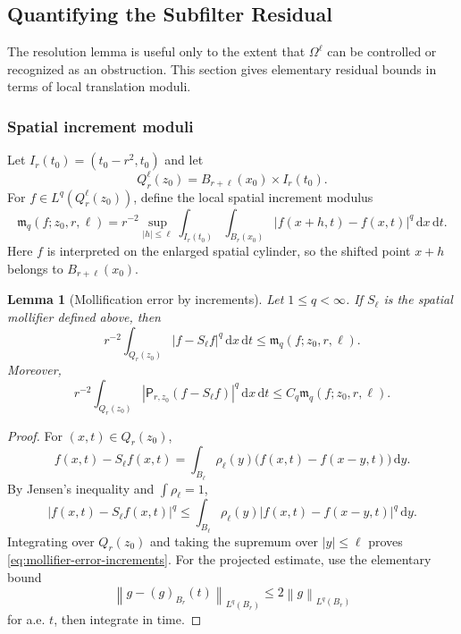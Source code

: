 \documentclass[11pt]{article}
\numberwithin{equation}{section}
\newtheorem{lemma}[theorem]{Lemma}
\newcommand{\dxdt}{\,\mathrm dx\,\mathrm dt}
\newcommand{\dy}{\,\mathrm dy}
\newcommand{\norm}[2]{\left\lVert #1\right\rVert_{#2}}
\newcommand{\Pf}{\mathsf P}
\begin{document}
\subsection{Quantifying the Subfilter Residual}

The resolution lemma is useful only to the extent that $\Omega^\ell$ can be controlled or recognized as an obstruction.  This section gives elementary residual bounds in terms of local translation moduli.

\subsubsection{Spatial increment moduli}

Let $I_r(t_0)=(t_0-r^2,t_0)$ and let
\[
Q_r^\ell(z_0)=B_{r+\ell}(x_0)\times I_r(t_0).
\]
For $f\in L^q(Q_r^\ell(z_0))$, define the local spatial increment modulus
\begin{equation}\label{eq:increment-modulus}
\mathfrak m_q(f;z_0,r,\ell)=
r^{-2}\sup_{|h|\le\ell}\int_{I_r(t_0)}\int_{B_r(x_0)}
|f(x+h,t)-f(x,t)|^q\dxdt.
\end{equation}
Here $f$ is interpreted on the enlarged spatial cylinder, so the shifted point $x+h$ belongs to $B_{r+\ell}(x_0)$.

\begin{lemma}[Mollification error by increments]\label{lem:mollifier-increments}
Let $1\le q<\infty$.  If $S_\ell$ is the spatial mollifier defined above, then
\begin{equation}\label{eq:mollifier-error-increments}
r^{-2}\int_{Q_r(z_0)}|f-S_\ell f|^q\dxdt
\le
\mathfrak m_q(f;z_0,r,\ell).
\end{equation}
Moreover,
\begin{equation}\label{eq:projected-mollifier-error-increments}
r^{-2}\int_{Q_r(z_0)}|\Pf_{r,z_0}(f-S_\ell f)|^q\dxdt
\le
C_q\mathfrak m_q(f;z_0,r,\ell).
\end{equation}
\end{lemma}

\begin{proof}
For $(x,t)\in Q_r(z_0)$,
\[
f(x,t)-S_\ell f(x,t)=\int_{B_\ell}\rho_\ell(y)\bigl(f(x,t)-f(x-y,t)\bigr)\dy.
\]
By Jensen's inequality and $\int\rho_\ell=1$,
\[
|f(x,t)-S_\ell f(x,t)|^q
\le
\int_{B_\ell}\rho_\ell(y)|f(x,t)-f(x-y,t)|^q\dy.
\]
Integrating over $Q_r(z_0)$ and taking the supremum over $|y|\le\ell$ proves \eqref{eq:mollifier-error-increments}.  For the projected estimate, use the elementary bound
\[
\norm{g-(g)_{B_r}(t)}{L^q(B_r)}\le 2\norm{g}{L^q(B_r)}
\]
for a.e. $t$, then integrate in time.
\end{proof}
\end{document}
